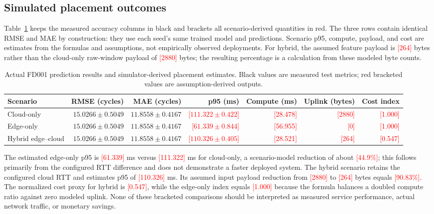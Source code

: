 ﻿\documentclass[conference]{IEEEtran}
\newcommand{\simval}[1]{\textcolor{red}{[#1]}}
\begin{document}
\subsection{Simulated placement outcomes}
Table~\ref{tab:results} keeps the measured accuracy columns in black and brackets all scenario-derived quantities in red. The three rows contain identical RMSE and MAE by construction: they use each seed's same trained model and predictions. Scenario p95, compute, payload, and cost are estimates from the formulas and assumptions, not empirically observed deployments. For hybrid, the assumed feature payload is \simval{264} bytes rather than the cloud-only raw-window payload of \simval{2880} bytes; the resulting percentage is a calculation from these modeled byte counts.

\begin{table}[t]
\caption{Actual FD001 prediction results and simulator-derived placement estimates. Black values are measured test metrics; red bracketed values are assumption-derived outputs.}
\label{tab:results}
\centering
\scriptsize
\setlength{\tabcolsep}{4pt}
\begin{tabular}{lrrrrrr}
\toprule
Scenario & RMSE (cycles) & MAE (cycles) & p95 (ms) & Compute (ms) & Uplink (bytes) & Cost index \\
\midrule
Cloud-only & $15.0266\pm0.5049$ & $11.8558\pm0.4167$ & \simval{$111.322\pm0.422$} & \simval{28.478} & \simval{2880} & \simval{1.000} \\
Edge-only & $15.0266\pm0.5049$ & $11.8558\pm0.4167$ & \simval{$61.339\pm0.844$} & \simval{56.955} & \simval{0} & \simval{1.000} \\
Hybrid edge--cloud & $15.0266\pm0.5049$ & $11.8558\pm0.4167$ & \simval{$110.326\pm0.405$} & \simval{28.521} & \simval{264} & \simval{0.547} \\
\bottomrule
\end{tabular}
\end{table}

The estimated edge-only p95 is \simval{61.339} ms versus \simval{111.322} ms for cloud-only, a scenario-model reduction of about \simval{44.9\%}; this follows primarily from the configured RTT difference and does not demonstrate a faster deployed system. The hybrid scenario retains the configured cloud RTT and estimates p95 of \simval{110.326} ms. Its assumed input payload reduction from \simval{2880} to \simval{264} bytes equals \simval{90.83\%}. The normalized cost proxy for hybrid is \simval{0.547}, while the edge-only index equals \simval{1.000} because the formula balances a doubled compute ratio against zero modeled uplink. None of these bracketed comparisons should be interpreted as measured service performance, actual network traffic, or monetary savings.
\end{document}
